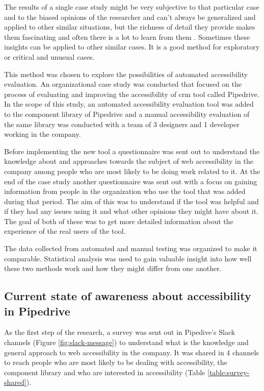 \documentclass{master_thesis}
\begin{document}
The results of a single case study might be very subjective to that particular case and to the biased opinions of the researcher and can't always be generalized and applied to other similar situations, but the richness of detail they provide makes them fascinating and often there is a lot to learn from them \citep{Range2023}. Sometimes these insights can be applied to other similar cases. It is a good method for exploratory or critical and unusual cases.

This method was chosen to explore the possibilities of automated accessibility evaluation. An organizational case study was conducted that focused on the process of evaluating and improving the accessibility of \ac{crm} tool called Pipedrive. In the scope of this study, an automated accessibility evaluation tool was added to the component library of Pipedrive and a manual accessibility evaluation of the same library was conducted with a team of 3 designers and 1 developer working in the company.

Before implementing the new tool a questionnaire was sent out to understand the knowledge about and approaches towards the subject of web accessibility in the company among people who are most likely to be doing work related to it. At the end of the case study another questionnaire was sent out with a focus on gaining information from people in the organization who use the tool that was added during that period. The aim of this was to understand if the tool was helpful and if they had any issues using it and what other opinions they might have about it. The goal of both of these was to get more detailed information about the experience of the real users of the tool.

The data collected from automated and manual testing was organized to make it comparable. Statistical analysis was used to gain valuable insight into how well these two methods work and how they might differ from one another.

\subsection{Current state of awareness about accessibility in Pipedrive}


As the first step of the research, a survey was sent out in Pipedive's Slack channels (Figure \ref{fig:slack-message}) to understand what is the knowledge and general approach to web accessibility in the company. It was shared in 4 channels to reach people who are most likely to be dealing with accessibility, the component library and who are interested in accessibility (Table \ref{table:survey-shared}).
\end{document}
